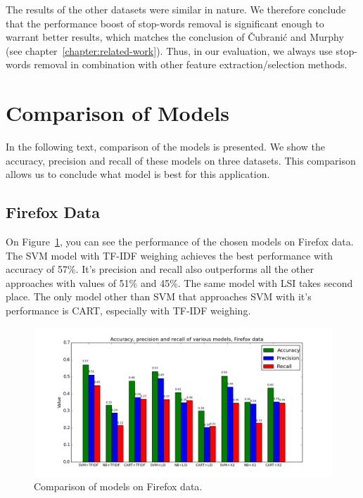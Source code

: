 The results of the other datasets were similar in nature. We therefore conclude that the performance boost of stop-words removal is significant enough to warrant better results, which matches the conclusion of Čubranić and Murphy~\cite{Murphy} (see chapter~\ref{chapter:related-work}). Thus, in our evaluation, we always use stop-words removal in combination with other feature extraction/selection methods.

\section{Comparison of Models}

In the following text, comparison of the models is presented. We show the accuracy, precision and recall of these models on three datasets. This comparison allows us to conclude what model is best for this application.

\subsection{Firefox Data}

On Figure~\ref{fig:results.models.firefox}, you can see the performance of the chosen models on Firefox data. The SVM model with TF-IDF weighing achieves the best performance with accuracy of 57\%. It's precision and recall also outperforms all the other approaches with values of 51\% and 45\%. The same model with LSI takes second place. The only model other than SVM that approaches SVM with it's performance is CART, especially with TF-IDF weighing.

\begin{figure}[htbp]
    \centering
        \includegraphics[width=\textwidth]{./images/comparison_of_models/firefox.png}
    \caption{Comparison of models on Firefox data.}
    \label{fig:results.models.firefox}
\end{figure}

